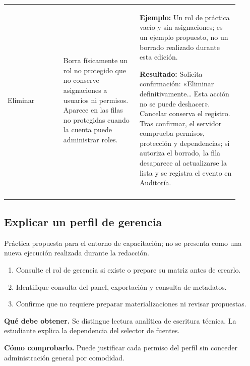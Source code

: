 \begin{longtable}{@{}>{\RaggedRight\arraybackslash}p{0.22\linewidth}>{\RaggedRight\arraybackslash}p{0.3\linewidth}>{\RaggedRight\arraybackslash}p{0.39\linewidth}@{}}
\addlinespace[3pt]
Eliminar & Borra físicamente un rol no protegido que no conserve asignaciones a usuarios ni permisos. Aparece en las filas no protegidas cuando la cuenta puede administrar roles. & \textbf{Ejemplo:} Un rol de práctica vacío y sin asignaciones; es un ejemplo propuesto, no un borrado realizado durante esta edición.\par\smallskip\textbf{Resultado:} Solicita confirmación: «Eliminar definitivamente… Esta acción no se puede deshacer». Cancelar conserva el registro. Tras confirmar, el servidor comprueba permisos, protección y dependencias; si autoriza el borrado, la fila desaparece al actualizarse la lista y se registra el evento en Auditoría. \\
\addlinespace[3pt]
\end{longtable}
\endgroup

\subsection{Explicar un perfil de gerencia}
Práctica propuesta para el entorno de capacitación; no se presenta como una nueva ejecución realizada durante la redacción.

\begin{enumerate}
\item Consulte el rol de gerencia si existe o prepare su matriz antes de crearlo.
\item Identifique consulta del panel, exportación y consulta de metadatos.
\item Confirme que no requiere preparar materializaciones ni revisar propuestas.
\end{enumerate}

\textbf{Qué debe obtener.} Se distingue lectura analítica de escritura técnica. La estudiante explica la dependencia del selector de fuentes.

\textbf{Cómo comprobarlo.} Puede justificar cada permiso del perfil sin conceder administración general por comodidad.

